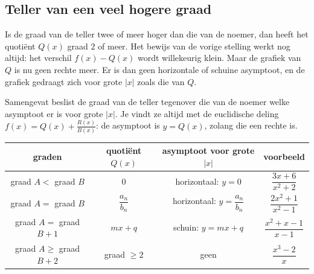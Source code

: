 \begin{oefeningen}
\end{oefeningen}

\subsection{Teller van een veel hogere graad}

Is de graad van de teller twee of meer hoger dan die van de noemer, dan heeft het quotiënt $Q(x)$ graad $2$ of meer. Het bewijs van de vorige stelling werkt nog altijd: het verschil $f(x) - Q(x)$ wordt willekeurig klein. Maar de grafiek van $Q$ is nu geen rechte meer. Er is dan geen horizontale of schuine asymptoot, en de grafiek gedraagt zich voor grote $|x|$ zoals die van $Q$.


Samengevat beslist de graad van de teller tegenover die van de noemer welke asymptoot er is voor grote $|x|$. Je vindt ze altijd met de euclidische deling $f(x) = Q(x) + \frac{R(x)}{B(x)}$: de asymptoot is $y = Q(x)$, zolang die een rechte is.

\begin{center}
\renewcommand{\arraystretch}{2.1}
\begin{tabular}{|c|c|c|c|}
\hline
\textbf{graden} & \textbf{quotiënt} $Q(x)$ & \textbf{asymptoot voor grote} $|x|$ & \textbf{voorbeeld} \\ \hline
graad $A <$ graad $B$ & $0$ & horizontaal: $y = 0$ & $\dfrac{3x + 6}{x^2 + 2}$ \\ \hline
graad $A =$ graad $B$ & $\dfrac{a_n}{b_n}$ & horizontaal: $y = \dfrac{a_n}{b_n}$ & $\dfrac{2x^2 + 1}{x^2 - 1}$ \\ \hline
graad $A =$ graad $B + 1$ & $mx + q$ & schuin: $y = mx + q$ & $\dfrac{x^2 + x - 1}{x - 1}$ \\ \hline
graad $A \geqslant$ graad $B + 2$ & graad $\geqslant 2$ & geen & $\dfrac{x^3 - 2}{x}$ \\ \hline
\end{tabular}
\end{center}

